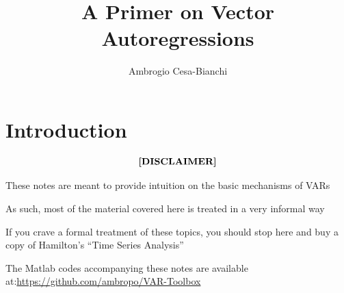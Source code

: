 \documentclass[10pt,english,t,aspectratio=169,ignorenonframetext]{beamer}
\title[VAR models]{\textbf{A Primer on Vector Autoregressions}}
\author[]{Ambrogio Cesa-Bianchi}
\date{}
\begin{document}

\section{Introduction}

\begin{frame}[plain] 
\titlepage
\end{frame}


\begin{frame}
\bigskip\bigskip
\begin{equation*}
\text{\textbf{[DISCLAIMER]}}
\end{equation*}

\bigskip \bigskip

\centering
\begin{minipage}{.8\textwidth}
These notes are meant to provide intuition on the basic mechanisms of
VARs\bigskip

As such, most of the material covered here is treated in a very informal
way\bigskip

If you crave a formal treatment of these topics, you should stop here and
buy a copy of Hamilton's \textquotedblleft Time Series
Analysis\textquotedblright\bigskip

The Matlab codes accompanying these notes are available at:\newline \url{https://github.com/ambropo/VAR-Toolbox}
\end{minipage}
\end{frame}

\end{document}
